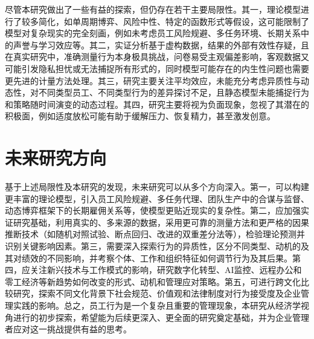尽管本研究做出了一些有益的探索，但仍存在若干主要局限性。其一，理论模型进行了较多简化，如单周期博弈、风险中性、特定的函数形式等假设，这可能限制了模型对复杂现实的完全刻画，例如未考虑员工风险规避、多任务环境、长期关系中的声誉与学习效应等。其二，实证分析基于虚构数据，结果的外部有效性存疑，且在真实研究中，准确测量行为本身极具挑战，问卷易受主观偏差影响，客观数据又可能引发隐私担忧或无法捕捉所有形式的，同时模型可能存在的内生性问题也需要更先进的计量方法处理。其三，研究主要关注平均效应，未能充分考虑异质性与动态性，对不同类型员工、不同类型行为的差异探讨不足，且静态模型未能捕捉行为和策略随时间演变的动态过程。其四，研究主要将视为负面现象，忽视了其潜在的积极面，例如适度放松可能有助于缓解压力、恢复精力，甚至激发创意。

\section{未来研究方向}

基于上述局限性及本研究的发现，未来研究可以从多个方向深入。第一，可以构建更丰富的理论模型，引入员工风险规避、多任务代理、团队生产中的合谋与监督、动态博弈框架下的长期雇佣关系等，使模型更贴近现实的复杂性。第二，应加强实证研究基础，利用真实的、多来源的数据，采用更可靠的测量方法和更严格的因果推断技术（如随机对照试验、断点回归、改进的双重差分法等），检验理论预测并识别关键影响因素。第三，需要深入探索行为的异质性，区分不同类型、动机的及其对绩效的不同影响，并考察个体、工作和组织特征如何调节行为及其后果。第四，应关注新兴技术与工作模式的影响，研究数字化转型、AI监控、远程办公和零工经济等新趋势如何改变的形式、动机和管理应对策略。第五，可进行跨文化比较研究，探索不同文化背景下社会规范、价值观和法律制度对行为接受度及企业管理实践的影响。总之，员工行为是一个复杂且重要的管理现象，本研究从经济学视角进行的初步探索，希望能为后续更深入、更全面的研究奠定基础，并为企业管理者应对这一挑战提供有益的思考。